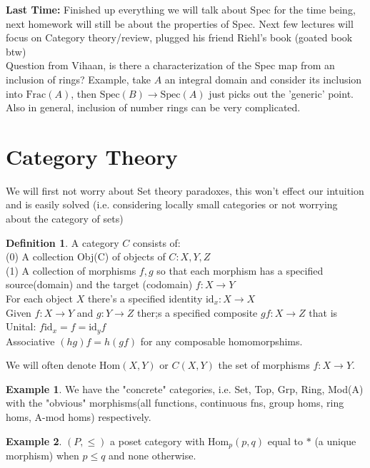 \documentclass{article}
\theoremstyle{definition}
\newtheorem{example}{Example}[section]
\theoremstyle{definition}
\newtheorem{definition}{Definition}[section]
\theoremstyle{remark}
\begin{document}
\textbf{Last Time:} Finished up everything we will talk about Spec for the time being, next homework will still be about the properties of Spec.
Next few lectures will focus on Category theory/review, plugged his friend Riehl's book (goated book btw)\\

Question from Vihaan, is there a characterization of the Spec map from an inclusion of rings?
Example, take $A$ an integral domain and consider its inclusion into $\text{Frac}(A)$, then $\text{Spec}(B) \to \text{Spec}(A)$ just picks out the 'generic' point.
Also in general, inclusion of number rings can be very complicated.

\section{Category Theory}
We will first not worry about Set theory paradoxes, this won't effect our intuition and is easily solved (i.e. considering locally small categories or not worrying about the category of sets)

\begin{definition}
	A category $C$ consists of:\\
	\indent (0) A collection Obj(C) of objects of $C:X,Y,Z$\\
	\indent (1) A collection of morphisms $f,g$ so that each morphism has a specified source(domain) and the target (codomain) $f: X \to Y$\\
	\indent For each object $X$ there's a specified identity $\text{id}_x: X \to X$\\
\indent Given $f: X \to Y$ and $g: Y \to Z$ ther;s a specified composite $gf: X \to Z$ that is\\
\indent Unital: $f \text{id}_x = f = \text{id}_yf$\\
\indent Associative $(hg)f = h(gf)$ for any composable homomorpshims.
\end{definition}

We will often denote $\text{Hom}(X,Y)$ or $C(X,Y)$ the set of morphisms $f: X \to Y$.

\begin{example}
	We have the "concrete" categories, i.e. Set, Top, Grp, Ring, Mod(A) with the "obvious" morphisms(all functions, continuous fns, group homs, ring homs, A-mod homs) respectively.
\end{example}

\begin{example}
	$(P, \leq)$ a poset category with $\text{Hom}_p(p,q)$ equal to $*$ (a unique morphism) when $p \leq q$ and none otherwise.
\end{example}
\end{document}
